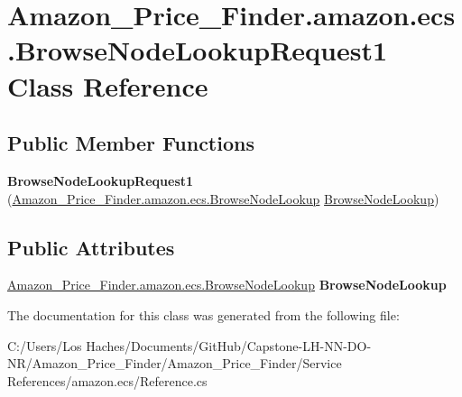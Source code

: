 \hypertarget{class_amazon___price___finder_1_1amazon_1_1ecs_1_1_browse_node_lookup_request1}{\section{Amazon\-\_\-\-Price\-\_\-\-Finder.\-amazon.\-ecs.\-Browse\-Node\-Lookup\-Request1 Class Reference}
\label{class_amazon___price___finder_1_1amazon_1_1ecs_1_1_browse_node_lookup_request1}
}
\subsection*{Public Member Functions}
\begin{DoxyCompactItemize}
\item 
\hypertarget{class_amazon___price___finder_1_1amazon_1_1ecs_1_1_browse_node_lookup_request1_aab8a8e1251d5185b8152417c28a93977}{{\bfseries Browse\-Node\-Lookup\-Request1} (\hyperlink{class_amazon___price___finder_1_1amazon_1_1ecs_1_1_browse_node_lookup}{Amazon\-\_\-\-Price\-\_\-\-Finder.\-amazon.\-ecs.\-Browse\-Node\-Lookup} \hyperlink{class_amazon___price___finder_1_1amazon_1_1ecs_1_1_browse_node_lookup}{Browse\-Node\-Lookup})}\label{class_amazon___price___finder_1_1amazon_1_1ecs_1_1_browse_node_lookup_request1_aab8a8e1251d5185b8152417c28a93977}

\end{DoxyCompactItemize}
\subsection*{Public Attributes}
\begin{DoxyCompactItemize}
\item 
\hypertarget{class_amazon___price___finder_1_1amazon_1_1ecs_1_1_browse_node_lookup_request1_a3ee911fae56ecdeb1a29b29a97bff128}{\hyperlink{class_amazon___price___finder_1_1amazon_1_1ecs_1_1_browse_node_lookup}{Amazon\-\_\-\-Price\-\_\-\-Finder.\-amazon.\-ecs.\-Browse\-Node\-Lookup} {\bfseries Browse\-Node\-Lookup}}\label{class_amazon___price___finder_1_1amazon_1_1ecs_1_1_browse_node_lookup_request1_a3ee911fae56ecdeb1a29b29a97bff128}

\end{DoxyCompactItemize}


The documentation for this class was generated from the following file\-:\begin{DoxyCompactItemize}
\item 
C\-:/\-Users/\-Los Haches/\-Documents/\-Git\-Hub/\-Capstone-\/\-L\-H-\/\-N\-N-\/\-D\-O-\/\-N\-R/\-Amazon\-\_\-\-Price\-\_\-\-Finder/\-Amazon\-\_\-\-Price\-\_\-\-Finder/\-Service References/amazon.\-ecs/Reference.\-cs\end{DoxyCompactItemize}
